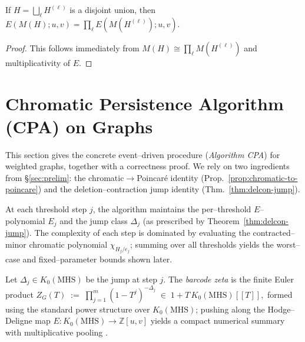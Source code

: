 \documentclass[runningheads]{llncs}
\begin{document}
\begin{lemma}
If $H=\bigsqcup_\ell H^{(\ell)}$ is a disjoint union, then 
$E(M(H);u,v)=\prod_\ell E(M(H^{(\ell)});u,v)$. 
\end{lemma}

\begin{proof}
This follows immediately from $M(H)\cong \prod_\ell M(H^{(\ell)})$ and multiplicativity of $E$.    
\end{proof}













































\section{Chromatic Persistence Algorithm (CPA) on Graphs}
\label{sec:cpa}

This section gives the concrete event–driven procedure (\emph{Algorithm CPA}) for weighted graphs, together with a correctness proof. We rely on two ingredients from \S\ref{sec:prelim}: the chromatic$\to$Poincaré identity (Prop.~\ref{prop:chromatic-to-poincare}) and the deletion–contraction jump identity (Thm.~\ref{thm:delcon-jump}).

At each threshold step $j$, the algorithm maintains the per–threshold $E$–polynomial 
$E_j$ and the jump class $\Delta_j$ (as prescribed by Theorem~\ref{thm:delcon-jump}). 
The complexity of each step is dominated by evaluating the contracted–minor 
chromatic polynomial $\chi_{H_j/e_j}$; summing over all thresholds yields the 
worst–case and fixed–parameter bounds shown later.

Let $\Delta_j\in K_0(\mathrm{MHS})$ be the jump at step $j$. The \emph{barcode
zeta} is the finite Euler product
$Z_G(T)\;:=\;\prod_{j=1}^m (1-T^j)^{-\Delta_j}\;\in\;1+T\,K_0(\mathrm{MHS})[[T]],$ 
formed using the standard power structure over $K_0(\mathrm{MHS})$; pushing
along the Hodge–Deligne map $E:K_0(\mathrm{MHS})\to\mathbb{Z}[u,v]$ yields a
compact numerical summary with multiplicative pooling \cite{GuseinZade2004}.
\end{document}
